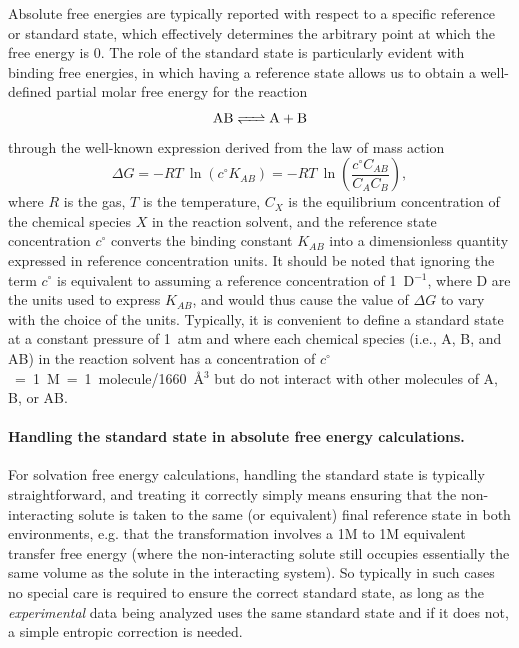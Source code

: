 \documentclass[9pt,bestpractices]{livecoms}
\begin{document}
Absolute free energies are typically reported with respect to a specific reference or standard state, which effectively determines the arbitrary point at which the free energy is 0.
The role of the standard state is particularly evident with binding free energies, in which having a reference state allows us to obtain a well-defined partial molar free energy for the reaction
\begin{equation*}
\ce{AB <=> A + B}
\end{equation*}
through the well-known expression derived from the law of mass action
\begin{equation} \label{eq:DGfromKAB}
\Delta G = -RT ~ \ln \left( c^{\circ} K_{AB} \right)  = -RT ~ \ln\left( \frac{c^{\circ} C_{AB}}{C_A C_B} \right) ,
\end{equation}
where $R$ is the gas, $T$ is the temperature, $C_X$ is the equilibrium concentration of the chemical species $X$ in the reaction solvent, and the reference state concentration $c^{\circ}$ converts the binding constant $K_{AB}$ into a dimensionless quantity expressed in reference concentration units.
It should be noted that ignoring the term $c^{\circ}$ is equivalent to assuming a reference concentration of 1~D$^{-1}$, where D are the units used to express $K_{AB}$, and would thus cause the value of $\Delta G$ to vary with the choice of the units.
Typically, it is convenient to define a standard state at a constant pressure of 1~atm and where each chemical species (i.e., A, B, and AB) in the reaction solvent has a concentration of $c^{\circ}$~=~1~M~=~1~molecule/1660~\r{A}$^3$ but do not interact with other molecules of A, B, or AB.

\paragraph{Handling the standard state in absolute free energy calculations.}

For solvation free energy calculations, handling the standard state is typically straightforward, and treating it correctly simply means ensuring that the non-interacting solute is taken to the same (or equivalent) final reference state in both environments, e.g. that the transformation involves a 1M to 1M equivalent transfer free energy (where the non-interacting solute still occupies essentially the same volume as the solute in the interacting system).
So typically in such cases no special care is required to ensure the correct standard state, as long as the \emph{experimental} data being analyzed uses the same standard state and if it does not, a simple entropic correction is needed.
\end{document}
